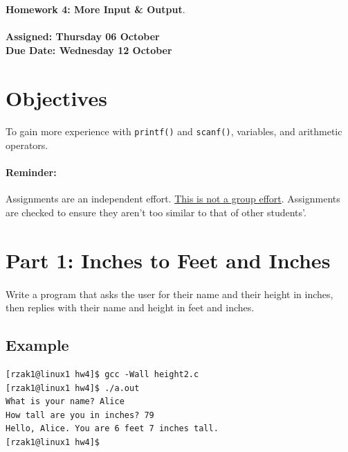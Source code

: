 \documentclass[letter,11pt]{article}
\begin{document}
\huge
\textbf{Homework 4: More Input \& Output}.
\normalsize
\\ ~~ \\
\textbf{Assigned: Thursday 06 October} \\
\textbf{Due Date: Wednesday 12 October}

\section*{Objectives}
\paragraph{}To gain more experience with \texttt{printf()} and \texttt{scanf()}, variables, and arithmetic operators.

\paragraph{Reminder:} Assignments are an independent effort. \underline{This is not a group effort}. Assignments are checked to ensure they aren't too similar to that of other students'.

\section*{Part 1: Inches to Feet and Inches}
\paragraph{}Write a program that asks the user for their name and their height in inches, then replies with their name and height in feet and inches. 

\subsection*{Example}
\begin{verbatim}
[rzak1@linux1 hw4]$ gcc -Wall height2.c
[rzak1@linux1 hw4]$ ./a.out
What is your name? Alice
How tall are you in inches? 79
Hello, Alice. You are 6 feet 7 inches tall.
[rzak1@linux1 hw4]$ 
\end{verbatim}
\end{document}

